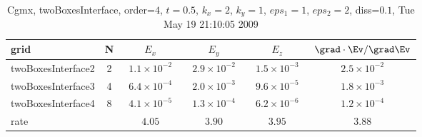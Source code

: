 \begin{table}[hbt]\tableFont %
\begin{center}
\begin{tabular}{|l|c|c|c|c|c|} \hline 
grid  & N &  $E_x$ &  $E_y$ & $E_z$ & $\grad\cdot\Ev/\grad\Ev$\\ \hline 
  twoBoxesInterface2 &     2 & ~$1.1\times10^{ -2}$~ & ~$2.9\times10^{ -2}$~ & ~$1.5\times10^{ -3}$~ & ~$2.5\times10^{ -2}$~  \\ \hline
  twoBoxesInterface3 &     4 & ~$6.4\times10^{ -4}$~ & ~$2.0\times10^{ -3}$~ & ~$9.6\times10^{ -5}$~ & ~$1.8\times10^{ -3}$~  \\ \hline
  twoBoxesInterface4 &     8 & ~$4.1\times10^{ -5}$~ & ~$1.3\times10^{ -4}$~ & ~$6.2\times10^{ -6}$~ & ~$1.2\times10^{ -4}$~  \\ \hline
    rate             &       &       $4.05$          &       $3.90$          &       $3.95$          &       $3.88$           \\ \hline
\end{tabular}
\caption{Cgmx, twoBoxesInterface, order=$4$, $t=0.5$, $k_x=2$, $k_y=1$, $eps_1=1$, $eps_2=2$, diss=$0.1$, Tue May 19 21:10:05 2009}\label{table:planeInterface3dOrder4}
\end{center}
\end{table}
